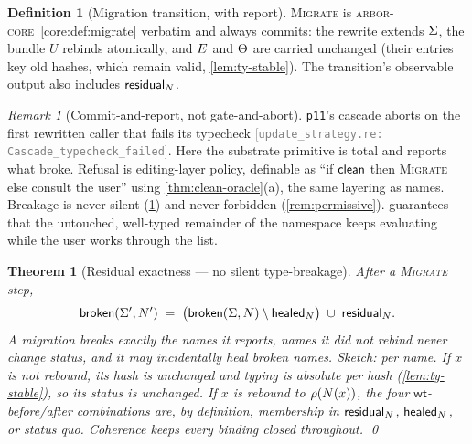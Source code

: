 \documentclass[11pt]{article}
\theoremstyle{definition}
\newtheorem{definition}{Definition}[section]
\theoremstyle{plain}
\newtheorem{theorem}{Theorem}[section]
\theoremstyle{remark}
\newtheorem{remark}{Remark}[section]
\newcommand{\src}[1]{{\footnotesize\textcolor{gray}{[\texttt{#1}]}}}
\newcommand{\arborcore}{\textsc{arbor-core}}
\newcommand{\coreref}[1]{\arborcore~\cref{core:#1}}
\begin{document}
\begin{definition}[Migration transition, with report]\label{def:migrate}
\textsc{Migrate} is \coreref{def:migrate} verbatim and always commits: the rewrite extends
$\Sigma$, the bundle $U$ rebinds atomically, and $E$ and $\Theta$ are carried unchanged
(their entries key old hashes, which remain valid, \cref{lem:ty-stable}). The transition's
observable output also includes $\mathsf{residual}_{N}$.
\end{definition}

\begin{remark}[Commit-and-report, not gate-and-abort]\label{rem:abort}
\texttt{p11}'s cascade aborts on the first rewritten caller that fails its typecheck
\src{update\_strategy.re: Cascade\_typecheck\_failed}. Here the substrate primitive is total
and reports what broke. Refusal is editing-layer policy, definable as ``if $\mathsf{clean}$ then
\textsc{Migrate} else consult the user'' using \cref{thm:clean-oracle}(a), the same layering
as names. Breakage is never silent (\cref{thm:residual-exact}) and never forbidden
(\cref{rem:permissive}).  guarantees that the untouched, well-typed remainder
of the namespace keeps evaluating while the user works through the list.
\end{remark}

\begin{theorem}[Residual exactness --- no silent type-breakage]\label{thm:residual-exact}
After a \textsc{Migrate} step,
\[
  \mathsf{broken}(\Sigma',N') \;=\;
  \bigl(\mathsf{broken}(\Sigma,N) \setminus \mathsf{healed}_{N}\bigr)
  \;\cup\; \mathsf{residual}_{N}.
\]
A migration breaks exactly the names it reports, names it did not rebind never change
status, and it may incidentally heal broken names. \emph{Sketch:} per name. If $x$ is not rebound, its hash is unchanged and typing
is absolute per hash (\cref{lem:ty-stable}), so its status is unchanged. If $x$ is rebound
to $\rho(N(x))$, the four $\mathsf{wt}$-before/after combinations are, by definition,
membership in $\mathsf{residual}_{N}$, $\mathsf{healed}_{N}$, or status quo. Coherence keeps
every binding closed throughout. \qed
\end{theorem}
\end{document}
